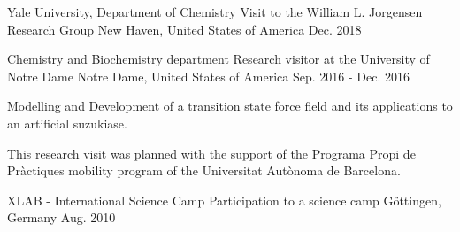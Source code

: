 

\begin{cventries}

  \cventry
    {Yale University, Department of Chemistry} %
    {Visit to the William L. Jorgensen Research Group} %
    {New Haven, United States of America} %
    {Dec. 2018} %
    {~}

  \cventry
    {Chemistry and Biochemistry department} %
    {Research visitor at the University of Notre Dame} %
    {Notre Dame, United States of America} %
    {Sep. 2016 - Dec. 2016} %
    {
      \begin{cvitems} %
        \item {Modelling and Development of a transition state force field and its applications to an artificial suzukiase.}
        \item {This research visit was planned with the support of the Programa Propi de Pràctiques mobility program of the Universitat Autònoma de Barcelona.}
      \end{cvitems}
    }

  \cventry
    {XLAB - International Science Camp} %
    {Participation to a science camp} %
    {Göttingen, Germany} %
    {Aug. 2010} %
    {~}

\end{cventries}
